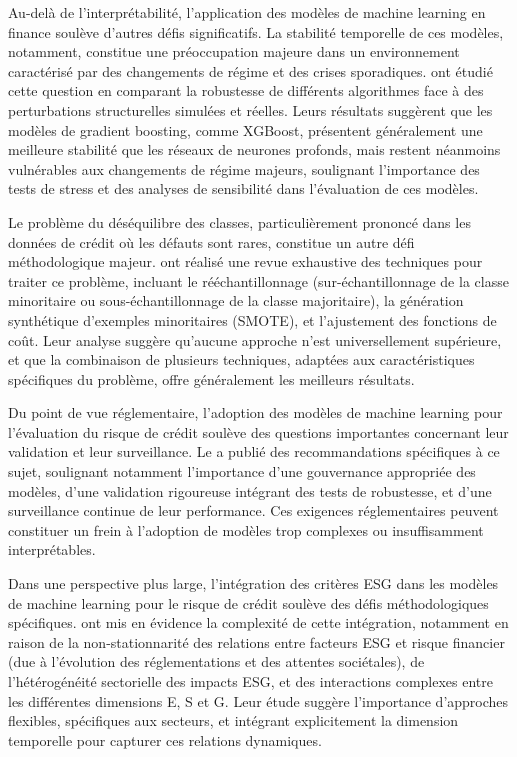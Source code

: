 Au-delà de l'interprétabilité, l'application des modèles de machine learning en finance soulève d'autres défis significatifs. La stabilité temporelle de ces modèles, notamment, constitue une préoccupation majeure dans un environnement caractérisé par des changements de régime et des crises sporadiques. \citet{moscatelli2020} ont étudié cette question en comparant la robustesse de différents algorithmes face à des perturbations structurelles simulées et réelles. Leurs résultats suggèrent que les modèles de gradient boosting, comme XGBoost, présentent généralement une meilleure stabilité que les réseaux de neurones profonds, mais restent néanmoins vulnérables aux changements de régime majeurs, soulignant l'importance des tests de stress et des analyses de sensibilité dans l'évaluation de ces modèles.

Le problème du déséquilibre des classes, particulièrement prononcé dans les données de crédit où les défauts sont rares, constitue un autre défi méthodologique majeur. \citet{fernandez2018} ont réalisé une revue exhaustive des techniques pour traiter ce problème, incluant le rééchantillonnage (sur-échantillonnage de la classe minoritaire ou sous-échantillonnage de la classe majoritaire), la génération synthétique d'exemples minoritaires (SMOTE), et l'ajustement des fonctions de coût. Leur analyse suggère qu'aucune approche n'est universellement supérieure, et que la combinaison de plusieurs techniques, adaptées aux caractéristiques spécifiques du problème, offre généralement les meilleurs résultats.

Du point de vue réglementaire, l'adoption des modèles de machine learning pour l'évaluation du risque de crédit soulève des questions importantes concernant leur validation et leur surveillance. Le \citet{comite2018} a publié des recommandations spécifiques à ce sujet, soulignant notamment l'importance d'une gouvernance appropriée des modèles, d'une validation rigoureuse intégrant des tests de robustesse, et d'une surveillance continue de leur performance. Ces exigences réglementaires peuvent constituer un frein à l'adoption de modèles trop complexes ou insuffisamment interprétables.

Dans une perspective plus large, l'intégration des critères ESG dans les modèles de machine learning pour le risque de crédit soulève des défis méthodologiques spécifiques. \citet{bolton2021} ont mis en évidence la complexité de cette intégration, notamment en raison de la non-stationnarité des relations entre facteurs ESG et risque financier (due à l'évolution des réglementations et des attentes sociétales), de l'hétérogénéité sectorielle des impacts ESG, et des interactions complexes entre les différentes dimensions E, S et G. Leur étude suggère l'importance d'approches flexibles, spécifiques aux secteurs, et intégrant explicitement la dimension temporelle pour capturer ces relations dynamiques.

